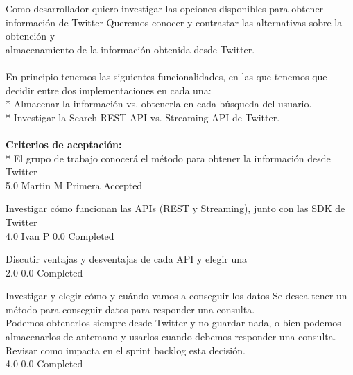 	{Como desarrollador quiero investigar las opciones disponibles para obtener información de Twitter} %
	{Queremos conocer y contrastar las alternativas sobre la obtención y\\
almacenamiento de la información obtenida desde Twitter.\\
  \\
En principio tenemos las siguientes funcionalidades, en las que tenemos que\\
decidir entre dos implementaciones en cada una:\\
* Almacenar la información vs. obtenerla en cada búsqueda del usuario.\\
* Investigar la Search REST API vs. Streaming API de Twitter.\\
  \\
\textbf{Criterios de aceptación:}\\
* El grupo de trabajo conocerá el método para obtener la información desde Twitter  \\
} %
	{} %
	{5.0} %
	{Martin M} %
	{Primera} %
	{Accepted} %

		{Investigar cómo funcionan las APIs (REST y Streaming), junto con las SDK de Twitter} %
		{\\
} %
		{4.0} %
		{Ivan P} %
		{0.0} %
		{Completed} %

		{Discutir ventajas y desventajas de cada API y elegir una} %
		{\\
} %
		{2.0} %
		{} %
		{0.0} %
		{Completed} %

		{Investigar y elegir cómo y cuándo vamos a conseguir los datos} %
		{Se desea tener un método para conseguir datos para responder una consulta.\\
Podemos obtenerlos siempre desde Twitter y no guardar nada, o bien podemos\\
almacenarlos de antemano y usarlos cuando debemos responder una consulta.\\
Revisar como impacta en el sprint backlog esta decisión.\\
} %
		{4.0} %
		{} %
		{0.0} %
		{Completed} %



